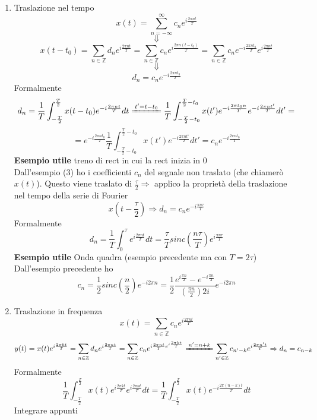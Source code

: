 \documentclass{article}
\newcommand{\accapo}{\\\hspace*{1cm}\\}
\begin{document}
\begin{enumerate}
    \item \large Traslazione nel tempo\normalsize
        \[x(t)=\sum_{n=-\infty}^\infty c_n e^{i\frac{2\pi nt}{T}}\]
        \[\Downarrow\]
        \[x(t-t_0)=\sum_{n\in\mathbb{Z}}d_n e^{i\frac{2\pi nt}{T}}=\sum_{n\in\mathbb{Z}}c_n e^{i\frac{2\pi n(t-t_0)}{T}}=\sum_{n\in\mathbb{Z}}c_n e^{-i\frac{2\pi nt_0}{T}} e^{i\frac{2\pi nt}{T}}\]
        \[\Downarrow\]
        \[d_n=c_n e^{-i\frac{2\pi nt_0}{T}}\]
        Formalmente
        \[d_n=\frac{1}{T}\int_{-\frac{T}{2}}^\frac{T}{2}x(t-t_0)e^{-i\frac{2\pi nt}{T}}dt\xlongequal{t'=t-t_0}\frac{1}{T}\int_{-\frac{T}{2}-t_0}^{\frac{T}{2}-t_0}x(t')e^{-i\frac{2\pi t_0 n}{T}}e^{-i\frac{2\pi nt'}{T}}dt'=\]
        \[=e^{-i\frac{2\pi n t_0}{T}}\frac{1}{T}\int_{-\frac{T}{2}-t_0}^{\frac{T}{2}-t_0}x(t')e^{-i\frac{2\pi nt'}{T}}dt'=c_n e^{-i\frac{2\pi nt_0}{T}}\]
        \textbf{Esempio utile} treno di rect in cui la rect inizia in 0\\
        Dall'esempio (3) ho i coefficienti \(c_n\) del segnale non traslato (che chiamerò \(x(t)\)). Questo viene traslato di \(\frac{\tau}{2}\Rightarrow\) applico la proprietà della traslazione nel tempo della serie di Fourier
        \[x\left(t-\frac{\tau}{2}\right)\Rightarrow d_n=c_n e^{-i\frac{\pi n\tau}{T}}\]
        Formalmente
        \[d_n=\frac{1}{T}\int_{0}^{\tau}e^{i\frac{2\pi nt}{T}}dt=\frac{\tau}{T}sinc\left(\frac{n\tau}{T}\right)e^{i\frac{\pi n\tau}{T}}\]
        \textbf{Esempio utile} Onda quadra (esempio precedente ma con \(T=2\tau\))\\
        Dall'esempio precedente ho
        \[c_n=\frac{1}{2}sinc\left(\frac{n}{2}\right)e^{-i2\pi n}=\frac{1}{2}\frac{e^{i\frac{\pi n}{2}}-e^{-i\frac{\pi n}{2}}}{\left(\frac{\pi n}{2}\right)2i}e^{-i2\pi n}\]
    \item \large Traslazione in frequenza\normalsize
        \[x(t)=\sum_{n\in\mathbb{Z}}c_n e^{i\frac{2\pi nt}{T}}\]
        \[y(t)=x(t)e^{i\frac{2\pi kt}{T}}=\sum_{n\in\mathbb{Z}}d_n e^{i\frac{2\pi nt}{T}}=\sum_{n\in\mathbb{Z}}c_n e^{i\frac{2\pi nt}{T}e^{i\frac{2\pi kt}{T}}}\xlongequal{n'=n+k}\sum_{n'\in\mathbb{Z}}c_{n'-k}e^{i\frac{2\pi n't}{T}}\Rightarrow d_n=c_{n-k}\]
        Formalmente
        \[\frac{1}{T}\int_{-\frac{T}{2}}^{\frac{T}{2}}x(t)e^{i\frac{2\pi kt}{T}}e^{i\frac{2\pi nt}{T}}dt=\frac{1}{T}\int_{-\frac{T}{2}}^\frac{T}{2}x(t)e^{-i\frac{2\pi(n-k)t}{T}}dt\]
        \LARGE Integrare appunti\accapo\normalsize
\end{enumerate}
\end{document}
